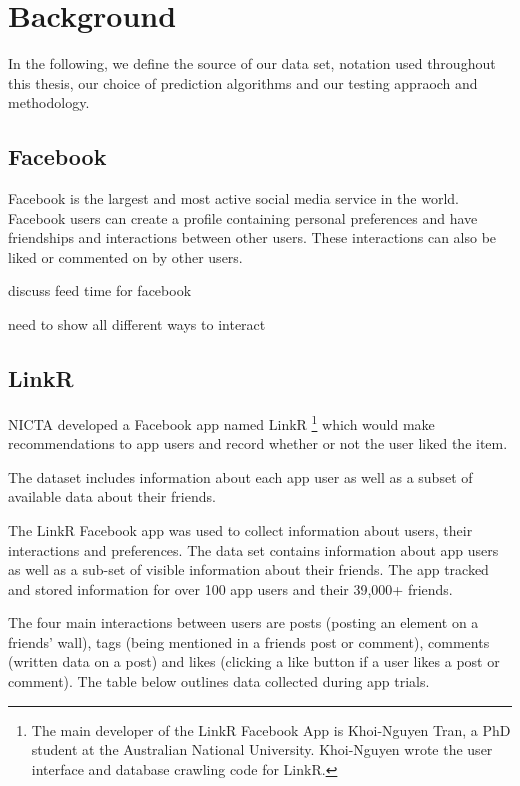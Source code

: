 
\chapter{Background}
\label{cha:back}

In the following, we define the source of our data set, notation used throughout this thesis, our choice of prediction algorithms and 
our testing appraoch and methodology.

\section{Facebook}
\label{sec:data}

Facebook is the largest and most active social media service in the world. Facebook users can create a profile containing personal preferences 
and have friendships and interactions between other users. These interactions can also be liked or commented on by other users.

discuss feed time for facebook

need to show all different ways to interact

\section{LinkR}
\label{sec:linkr}

NICTA developed a Facebook app named LinkR \footnote{The main developer of the LinkR
Facebook App is Khoi-Nguyen Tran, a PhD student at the Australian
National University.  Khoi-Nguyen wrote the user interface and database
crawling code for LinkR.} 
which would make recommendations to app users and record whether or not the user liked the item.

The dataset includes information about each app user as well as a subset of available data about their friends.

The LinkR Facebook app was used to collect information about users, their interactions and preferences. The data set contains information about app users as 
well as a sub-set of visible information about their friends. The app tracked and stored information for over 100 app users and their 39,000+ friends.

The four main interactions between users are posts (posting an element on a friends' wall), tags (being mentioned in a friends post or comment), 
comments (written data on a post) and likes (clicking a like button if a user likes a post or comment). The table below outlines data collected during 
app trials.
 
